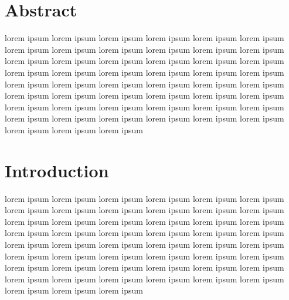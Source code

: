 \documentclass[acmtog]{acmart}
\begin{document}


\maketitle

\section{Abstract}

lorem ipsum  lorem ipsum  lorem ipsum  lorem ipsum  lorem ipsum  lorem ipsum  lorem ipsum  lorem ipsum  lorem ipsum  lorem ipsum  lorem ipsum  lorem ipsum  lorem ipsum  lorem ipsum  lorem ipsum  lorem ipsum  lorem ipsum  lorem ipsum  lorem ipsum  lorem ipsum  lorem ipsum  lorem ipsum  lorem ipsum  lorem ipsum  lorem ipsum  lorem ipsum  lorem ipsum  lorem ipsum  lorem ipsum  lorem ipsum  lorem ipsum  lorem ipsum  lorem ipsum  lorem ipsum  lorem ipsum  lorem ipsum  lorem ipsum  lorem ipsum  lorem ipsum  lorem ipsum  lorem ipsum  lorem ipsum  lorem ipsum  lorem ipsum  lorem ipsum  lorem ipsum  lorem ipsum  lorem ipsum  lorem ipsum  lorem ipsum  lorem ipsum

\section{Introduction}

lorem ipsum  lorem ipsum  lorem ipsum  lorem ipsum  lorem ipsum  lorem ipsum  lorem ipsum  lorem ipsum  lorem ipsum  lorem ipsum  lorem ipsum  lorem ipsum  lorem ipsum  lorem ipsum  lorem ipsum  lorem ipsum  lorem ipsum  lorem ipsum  lorem ipsum  lorem ipsum  lorem ipsum  lorem ipsum  lorem ipsum  lorem ipsum  lorem ipsum  lorem ipsum  lorem ipsum  lorem ipsum  lorem ipsum  lorem ipsum  lorem ipsum  lorem ipsum  lorem ipsum  lorem ipsum  lorem ipsum  lorem ipsum  lorem ipsum  lorem ipsum  lorem ipsum  lorem ipsum  lorem ipsum  lorem ipsum  lorem ipsum  lorem ipsum  lorem ipsum  lorem ipsum  lorem ipsum  lorem ipsum  lorem ipsum  lorem ipsum  lorem ipsum  
\end{document}
